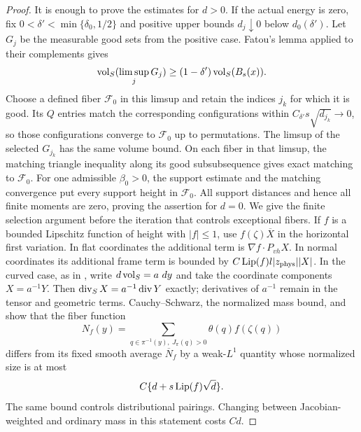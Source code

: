 \begin{proof}
It is enough to prove the estimates for $d>0$.  If the actual energy is
zero, fix $0<\delta'<\min\{\delta_0,1/2\}$ and positive upper bounds
$d_j\downarrow0$ below $d_0(\delta')$.  Let $G_j$ be the measurable good
sets from the positive case.  Fatou's lemma applied to their complements
gives
\[
 \operatorname{vol}_S(\limsup_jG_j)\ge(1-\delta')\operatorname{vol}_S(B_s(x)).
\]
Choose a defined fiber $\mathcal F_0$ in this limsup and retain the indices
$j_k$ for which it is good.  Its $Q$ entries match the corresponding
configurations within $C_{\delta'}s\sqrt{d_{j_k}}\to0$, so those configurations
converge to $\mathcal F_0$ up to permutations.  The limsup of the selected
$G_{j_k}$ has the same volume bound.  On each fiber in that limsup, the
matching triangle inequality along its good subsubsequence gives exact
matching to $\mathcal F_0$.  For one admissible $\beta_0>0$, the support
estimate and the matching convergence put every support height in
$\mathcal F_0$.  All support distances and hence all finite moments are
zero, proving the assertion for $d=0$.
We give the finite selection argument before the iteration that controls
exceptional fibers.  If $f$ is a bounded Lipschitz function of height with
$|f|\le1$, use $f(\zeta)\overline X$ in the horizontal first variation.
In flat coordinates the additional term is
$\nabla f\cdot P_{vh}X$.  In normal coordinates its additional frame term is
bounded by $C\operatorname{Lip}(f)l|z_{\rm phys}||X|$.  In the curved case, as in
, write $\mathop{}\!d\operatorname{vol}_S=a\,\mathop{}\!d y$ and take the coordinate
components $X=a^{-1}Y$.  Then $\operatorname{div}_SX=a^{-1}\operatorname{div} Y$ exactly; derivatives
of $a^{-1}$ remain in the tensor and geometric terms.  Cauchy--Schwarz,
the normalized mass bound, and  show that the
fiber function
\[
 N_f(y)=\sum_{q\in\pi^{-1}(y),\ J_\pi(q)>0}\theta(q)f(\zeta(q))
\]
differs from its fixed smooth average $\overline N_f$ by a weak-$L^1$
quantity whose normalized size is at most
\begin{equation}\label{eq:lt-multiplier-oscillation}
 C\{d+s\operatorname{Lip}(f)\sqrt d\}.
\end{equation}
The same bound controls distributional pairings.  Changing between
Jacobian-weighted and ordinary mass in this statement costs $Cd$.


\end{proof}
